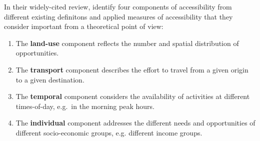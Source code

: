 In their widely-cited review, \citet{Geurs2004AccessibilityReview} identify four components of accessibility from different existing definitons and applied measures of accessibility that they consider important from a theoretical point of view:

\begin{enumerate}
	\item The \textbf{land-use} component reflects
	the number and spatial distribution of opportunities.
	
	\item The \textbf{transport} component describes the effort
	to travel from a given origin to a given destination.
	
	\item The \textbf{temporal} component considers the availability of activities at
	different times-of-day, e.g.\ in the morning peak hours.
	
	\item The \textbf{individual} component addresses the different needs and
	opportunities of different socio-economic groups, e.g. different income groups.
\end{enumerate}

